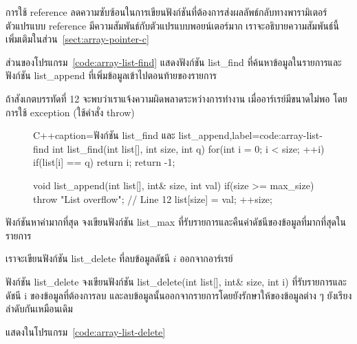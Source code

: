 การ{\wbr}ใช้ reference ลด{\wbr}ความ{\wbr}ซับซ้อน{\wbr}ใน{\wbr}การ{\wbr}เขียน{\wbr}ฟังก์ชัน{\wbr}ที่{\wbr}ต้องการ{\wbr}ส่ง{\wbr}ผลลัพธ์{\wbr}กลับ{\wbr}ทาง{\wbr}พารามิเตอร์{\wbr}
ตัวแปร{\wbr}แบบ reference มี{\wbr}ความ{\wbr}สัมพันธ์{\wbr}กับ{\wbr}ตัวแปร{\wbr}แบบ{\wbr}พอยน์เตอร์{\wbr}มาก{\wbr}
เรา{\wbr}จะ{\wbr}อธิบาย{\wbr}ความ{\wbr}สัมพันธ์{\wbr}นี้{\wbr}เพิ่มเติม{\wbr}ใน{\wbr}ส่วน~\ref{sect:array-pointer-c}

ส่วน{\wbr}ของ{\wbr}โปรแกรม~\ref{code:array-list-find} แสดง{\wbr}ฟังก์ชัน {\ct list\_find}
ที่{\wbr}ค้น{\wbr}หา{\wbr}ข้อมูล{\wbr}ใน{\wbr}รายการ{\wbr}และ{\wbr}ฟังก์ชัน {\ct list\_append}
ที่{\wbr}เพิ่ม{\wbr}ข้อมูล{\wbr}เข้า{\wbr}ไป{\wbr}ตอน{\wbr}ท้าย{\wbr}ของ{\wbr}รายการ{\wbr}

ถ้า{\wbr}สังเกต{\wbr}บรรทัด{\wbr}ที่ 12 จะ{\wbr}พบ{\wbr}ว่า{\wbr}เรา{\wbr}แจ้ง{\wbr}ความ{\wbr}ผิดพลาด{\wbr}ระหว่าง{\wbr}การ{\wbr}ทำงาน{\wbr}
เมื่อ{\wbr}อาร์{\wbr}เรย์{\wbr}มี{\wbr}ขนาด{\wbr}ไม่{\wbr}พอ โดย{\wbr}การ{\wbr}ใช้ exception (ใช้{\wbr}คำ{\wbr}สั่ง {\ct throw})


\begin{figure}
\latintext
\begin{codelist}{C++}{caption={\thaitext ฟังก์ชัน {\ct list\_find} และ {\ct list\_append}\latintext},label=code:array-list-find}
int list_find(int list[], int size, int q)
{
  for(int i = 0; i < size; ++i)
    if(list[i] == q)
      return i;
  return -1;
}

void list_append(int list[], int& size, int val)
{
  if(size >= max_size)
    throw "List overflow";      // Line 12
  list[size] = val;
  ++size;
}
\end{codelist}
\thaitext
\end{figure}

\begin{quiz}{ฟังก์ชัน{\wbr}หา{\wbr}ค่า{\wbr}มาก{\wbr}ที่สุด}
จง{\wbr}เขียน{\wbr}ฟังก์ชัน {\ct list\_max} ที่{\wbr}รับ{\wbr}รายการ{\wbr}และ{\wbr}คืน{\wbr}ค่า{\wbr}ดัชนี{\wbr}ของ{\wbr}ข้อมูล{\wbr}ที่{\wbr}มาก{\wbr}ที่สุด{\wbr}ใน{\wbr}รายการ{\wbr}
\end{quiz}

เรา{\wbr}จะ{\wbr}เขียน{\wbr}ฟังก์ชัน {\ct list\_delete} ที่{\wbr}ลบ{\wbr}ข้อมูล{\wbr}ดัชนี $i$ ออก{\wbr}จาก{\wbr}อาร์{\wbr}เรย์  

\begin{quiz}{ฟังก์ชัน {\ct list\_delete}}
จง{\wbr}เขียน{\wbr}ฟังก์ชัน {\ct list\_delete(int list[], int\& size, int i)}
ที่{\wbr}รับ{\wbr}รายการ{\wbr}และ{\wbr}ดัชนี {\ct i} ของ{\wbr}ข้อมูล{\wbr}ที่{\wbr}ต้องการ{\wbr}ลบ{\wbr}
และ{\wbr}ลบ{\wbr}ข้อมูล{\wbr}นั้น{\wbr}ออก{\wbr}จาก{\wbr}รายการ{\wbr}โดย{\wbr}ยัง{\wbr}รักษา{\wbr}ให้{\wbr}ของ{\wbr}ข้อมูล{\wbr}ต่าง ๆ ยัง{\wbr}เรียง{\wbr}ลำดับ{\wbr}กัน{\wbr}เหมือน{\wbr}เดิม{\wbr}
\end{quiz}
\begin{quizans}
แสดง{\wbr}ใน{\wbr}โปรแกรม~\ref{code:array-list-delete}
\end{quizans}

